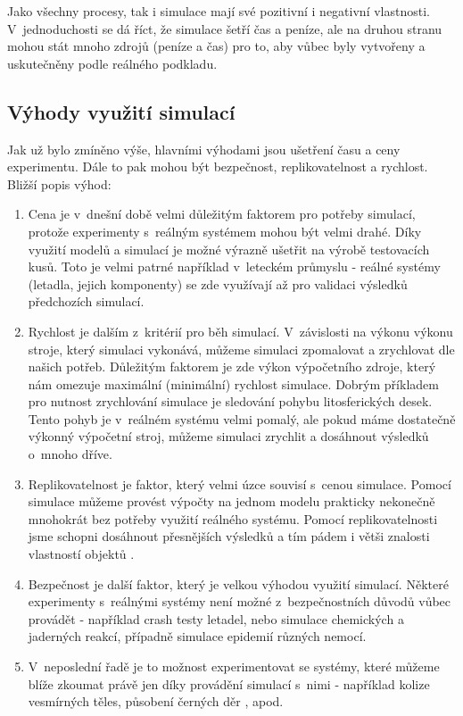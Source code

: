 Jako všechny procesy, tak i simulace mají své pozitivní i negativní vlastnosti. V~jednoduchosti se dá říct, že simulace šetří čas a peníze, ale na druhou stranu mohou stát mnoho zdrojů (peníze a čas) pro to, aby vůbec byly vytvořeny a uskutečněny podle reálného podkladu.

\subsection{Výhody využití simulací}
\label{vyhody}
Jak už bylo zmíněno výše, hlavními výhodami jsou ušetření času a ceny experimentu. Dále to pak mohou být bezpečnost, replikovatelnost a rychlost. Bližší popis výhod:

\begin{enumerate}
    \item Cena je v~dnešní době velmi důležitým faktorem pro potřeby simulací, protože experimenty s~reálným systémem mohou být velmi drahé. Díky využití modelů a simulací je možné výrazně ušetřit na výrobě testovacích kusů. Toto je velmi patrné například v~leteckém průmyslu - reálné systémy (letadla, jejich komponenty) se zde využívají až pro validaci výsledků předchozích simulací.
    \item Rychlost je dalším z~kritérií pro běh simulací. V~závislosti na výkonu výkonu stroje, který simulaci vykonává, můžeme simulaci zpomalovat a zrychlovat dle našich potřeb. Důležitým faktorem je zde výkon výpočetního zdroje, který nám omezuje maximální (minimální) rychlost simulace. Dobrým příkladem pro nutnost zrychlování simulace je sledování pohybu litosferických desek. Tento pohyb je v~reálném systému velmi pomalý, ale pokud máme dostatečně výkonný výpočetní stroj, můžeme simulaci zrychlit a dosáhnout výsledků o~mnoho dříve.
    \item Replikovatelnost je faktor, který velmi úzce souvisí s~cenou simulace. Pomocí simulace můžeme provést výpočty na jednom modelu prakticky nekonečně mnohokrát bez potřeby využití reálného systému. Pomocí replikovatelnosti jsme schopni dosáhnout přesnějších výsledků a tím pádem i větši znalosti vlastností objektů \cite{belanger2010and}.
    \item Bezpečnost je další faktor, který je velkou výhodou využití simulací. Některé experimenty s~reálnými systémy není možné z~bezpečnostních důvodů vůbec provádět - například crash testy letadel, nebo simulace chemických a jaderných reakcí, případně simulace epidemií různých nemocí.
    \item V~neposlední řadě je to možnost experimentovat se systémy, které můžeme blíže zkoumat právě jen díky provádění simulací s~nimi - například kolize vesmírných těles, působení černých děr \cite{Fragile_2007}, apod.
\end{enumerate}

